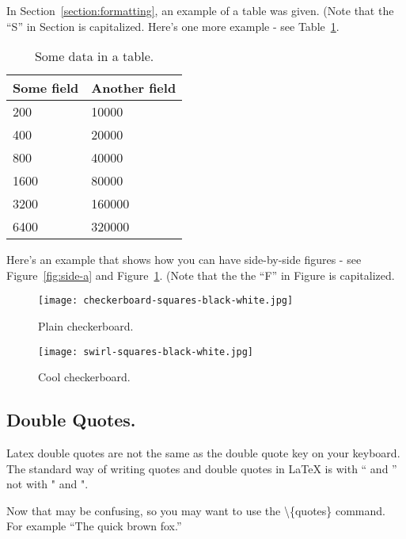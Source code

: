 \documentclass[pageno]{jpaper}
\newcommand{\quotes}[1]{``#1''}
\begin{document}
In Section~\ref{section:formatting}, an example of a table was given.
(Note that the ``S'' in Section is capitalized.  Here's one more
example - see Table~\ref{table:data}.

\begin{table}[hbt]
  \centering
  \begin{tabular}{|l|l|} \hline
    \textbf{Some field} & \textbf{Another field}\\\hline
    200          &  10000 \\ \hline 
    400          &  20000 \\ \hline 
    800          &  40000 \\ \hline 
    1600        &  80000 \\ \hline 
    3200        &  160000 \\ \hline 
    6400        &  320000 \\ \hline 
  \end{tabular}
  \caption{Some data in a table. }
  \label{table:data}
\end{table}


Here's an example that shows how you can have side-by-side figures -
see Figure~\ref{fig:side-a} and Figure~\ref{fig:side-b}.  (Note that
the the ``F'' in Figure is capitalized. 

\begin{figure}[htbb]
\begin{minipage}[b]{0.5\linewidth}
\centering
\texttt{[image: checkerboard-squares-black-white.jpg]}
\caption{Plain checkerboard.}
\label{fig:side-a}
\end{minipage}
\hspace{0.5cm}
\begin{minipage}[b]{0.5\linewidth}
\centering
\texttt{[image: swirl-squares-black-white.jpg]}
\caption{Cool checkerboard.}
\label{fig:side-b}
\end{minipage}
\end{figure}

\subsection{Double Quotes.}

Latex double quotes are not the same as the double quote key on your
keyboard. The standard way of writing quotes and double quotes in
LaTeX is with `` and '' not with " and ".   

Now that may be confusing, so you may want to use the \textbackslash\{quotes\} command.  For
example \quotes{The quick brown fox.}
\end{document}
